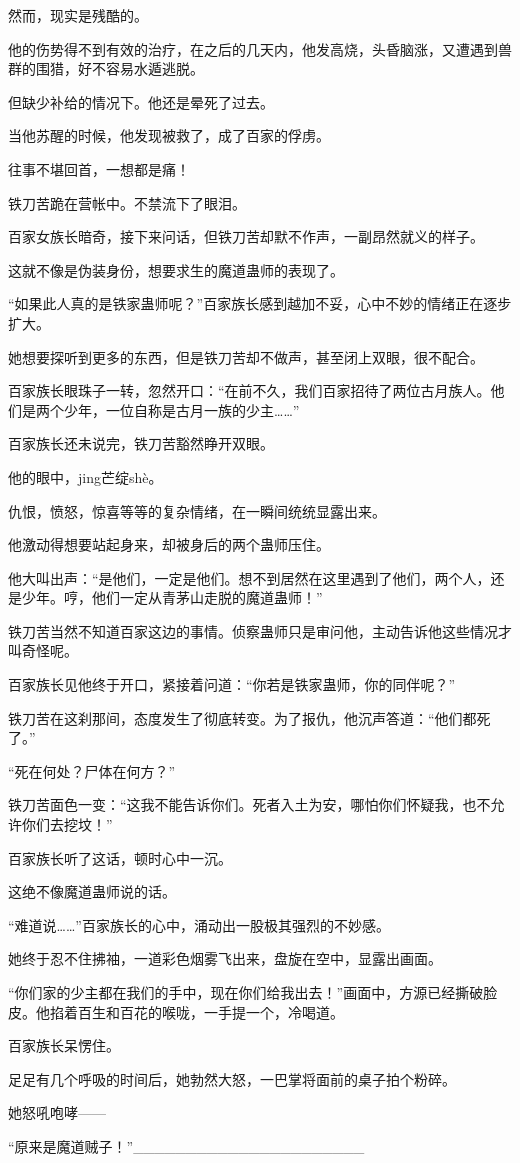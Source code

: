 \begin{this_body}
然而，现实是残酷的。

他的伤势得不到有效的治疗，在之后的几天内，他发高烧，头昏脑涨，又遭遇到兽群的围猎，好不容易水遁逃脱。

但缺少补给的情况下。他还是晕死了过去。

当他苏醒的时候，他发现被救了，成了百家的俘虏。

往事不堪回首，一想都是痛！

铁刀苦跪在营帐中。不禁流下了眼泪。

百家女族长暗奇，接下来问话，但铁刀苦却默不作声，一副昂然就义的样子。

这就不像是伪装身份，想要求生的魔道蛊师的表现了。

“如果此人真的是铁家蛊师呢？”百家族长感到越加不妥，心中不妙的情绪正在逐步扩大。

她想要探听到更多的东西，但是铁刀苦却不做声，甚至闭上双眼，很不配合。

百家族长眼珠子一转，忽然开口：“在前不久，我们百家招待了两位古月族人。他们是两个少年，一位自称是古月一族的少主……”

百家族长还未说完，铁刀苦豁然睁开双眼。

他的眼中，jing芒绽shè。

仇恨，愤怒，惊喜等等的复杂情绪，在一瞬间统统显露出来。

他激动得想要站起身来，却被身后的两个蛊师压住。

他大叫出声：“是他们，一定是他们。想不到居然在这里遇到了他们，两个人，还是少年。哼，他们一定从青茅山走脱的魔道蛊师！”

铁刀苦当然不知道百家这边的事情。侦察蛊师只是审问他，主动告诉他这些情况才叫奇怪呢。

百家族长见他终于开口，紧接着问道：“你若是铁家蛊师，你的同伴呢？”

铁刀苦在这刹那间，态度发生了彻底转变。为了报仇，他沉声答道：“他们都死了。”

“死在何处？尸体在何方？”

铁刀苦面色一变：“这我不能告诉你们。死者入土为安，哪怕你们怀疑我，也不允许你们去挖坟！”

百家族长听了这话，顿时心中一沉。

这绝不像魔道蛊师说的话。

“难道说……”百家族长的心中，涌动出一股极其强烈的不妙感。

她终于忍不住拂袖，一道彩色烟雾飞出来，盘旋在空中，显露出画面。

“你们家的少主都在我们的手中，现在你们给我出去！”画面中，方源已经撕破脸皮。他掐着百生和百花的喉咙，一手提一个，冷喝道。

百家族长呆愣住。

足足有几个呼吸的时间后，她勃然大怒，一巴掌将面前的桌子拍个粉碎。

她怒吼咆哮——

“原来是魔道贼子！”\_\_\_\_\_\_\_\_\_\_\_\_\_\_\_\_\_\_\_\_\_\_

\end{this_body}

